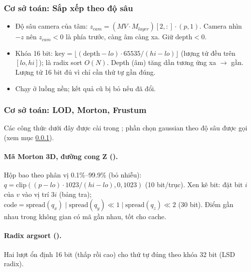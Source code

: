 \subsubsection{Cơ sở toán: Sắp xếp theo độ sâu}\label{s:sort}
\begin{itemize}
\item Độ sâu camera của tâm: $z_{cam}=(MV\cdot M_{layer})[2,:]\cdot(p,1)$. Camera nhìn $-z$ nên $z_{cam}<0$ là phía trước, càng âm càng xa. Giữ $\mathrm{depth}<0$.
\item Khóa 16 bit: $\mathrm{key}=\lfloor(\mathrm{depth}-lo)\cdot65535/(hi-lo)\rfloor$ (lượng tử đều trên $[lo,hi]$);  là radix sort $O(N)$. Depth (âm) tăng dần tương ứng xa $\to$ gần. Lượng tử 16 bit đủ vì chỉ cần thứ tự gần đúng.
\item Chạy ở luồng nền; kết quả cũ bị bỏ nếu  đã đổi.
\end{itemize}
\subsubsection{Cơ sở toán: LOD, Morton, Frustum}\label{s:lod}
Các công thức dưới đây được cài trong ; phần chọn gaussian theo độ sâu được  gọi (xem mục \ref{s:sort}).

\paragraph{Mã Morton 3D, đường cong Z ().}
Hộp bao theo phân vị 0.1\%--99.9\% (bỏ nhiễu): $q=\mathrm{clip}((p-lo)\cdot1023/(hi-lo),0,1023)$ (10 bit/trục). Xen kẽ bit:  đặt bit $i$ của $v$ vào vị trí $3i$ (bảng tra); $\mathrm{code}=\mathrm{spread}(q_x)\mid\mathrm{spread}(q_y)\ll1\mid\mathrm{spread}(q_z)\ll2$ (30 bit). Điểm gần nhau trong không gian có mã gần nhau, tốt cho cache.

\paragraph{Radix argsort ().}
Hai lượt ổn định 16 bit (thấp rồi cao) cho thứ tự đúng theo khóa 32 bit (LSD radix).


